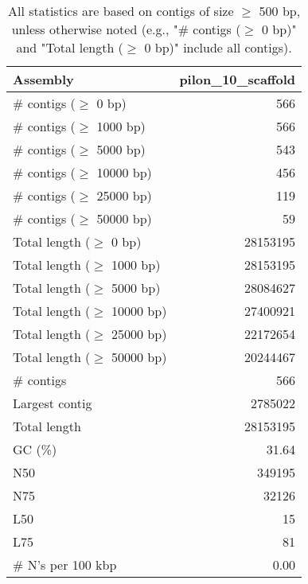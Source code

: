 \documentclass[12pt,a4paper]{article}
\begin{document}
\begin{table}[ht]
\begin{center}
\caption{All statistics are based on contigs of size $\geq$ 500 bp, unless otherwise noted (e.g., "\# contigs ($\geq$ 0 bp)" and "Total length ($\geq$ 0 bp)" include all contigs).}
\begin{tabular}{|l*{1}{|r}|}
\hline
Assembly & pilon\_10\_scaffold \\ \hline
\# contigs ($\geq$ 0 bp) & 566 \\ \hline
\# contigs ($\geq$ 1000 bp) & 566 \\ \hline
\# contigs ($\geq$ 5000 bp) & 543 \\ \hline
\# contigs ($\geq$ 10000 bp) & 456 \\ \hline
\# contigs ($\geq$ 25000 bp) & 119 \\ \hline
\# contigs ($\geq$ 50000 bp) & 59 \\ \hline
Total length ($\geq$ 0 bp) & 28153195 \\ \hline
Total length ($\geq$ 1000 bp) & 28153195 \\ \hline
Total length ($\geq$ 5000 bp) & 28084627 \\ \hline
Total length ($\geq$ 10000 bp) & 27400921 \\ \hline
Total length ($\geq$ 25000 bp) & 22172654 \\ \hline
Total length ($\geq$ 50000 bp) & 20244467 \\ \hline
\# contigs & 566 \\ \hline
Largest contig & 2785022 \\ \hline
Total length & 28153195 \\ \hline
GC (\%) & 31.64 \\ \hline
N50 & 349195 \\ \hline
N75 & 32126 \\ \hline
L50 & 15 \\ \hline
L75 & 81 \\ \hline
\# N's per 100 kbp & 0.00 \\ \hline
\end{tabular}
\end{center}
\end{table}
\end{document}

